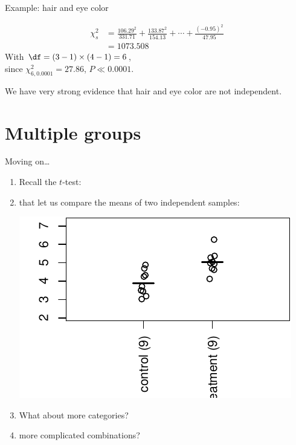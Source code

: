 \begin{frame}{Example: hair and eye color}

  \begin{align*}
    \chi^2_s &= \frac{106.29^2}{331.71} + \frac{133.87^2}{154.13} + \cdots + \frac{(-0.95)^2}{47.95} \\
        &= 1073.508
  \end{align*}
  With $\df = (3-1)\times(4-1) = 6$, \\
  since $\chi^2_{6,0.0001} = 27.86$, 
  $P \ll 0.0001$.

  \vspace{2em}

  We have \alert{very strong} evidence that hair and eye color are \alert{not} independent.


\end{frame}


\section{Multiple groups}

\begin{frame}{Moving on\ldots}
  \begin{enumerate}
    \item Recall the $t$-test:
    \item that let us \alert{compare the means} of two independent samples:
      \begin{center}
        \includegraphics{dots1ex}
      \end{center}
    \item What about more categories?
    \item more complicated combinations?
  \end{enumerate}
\end{frame}

